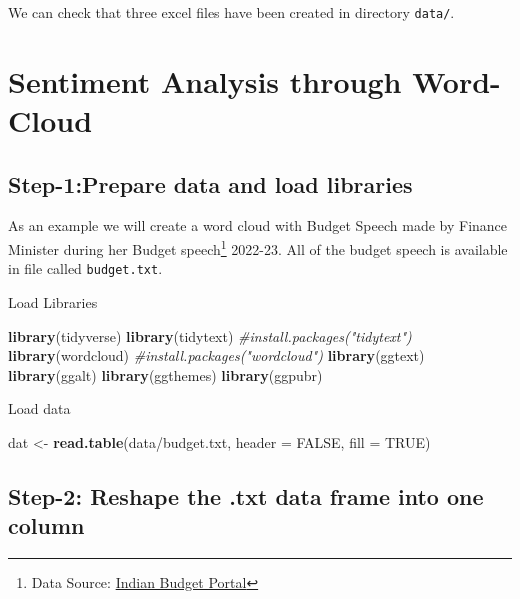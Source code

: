 \documentclass[
]{book}
\newenvironment{Shaded}{\begin{snugshade}}{\end{snugshade}}
\newcommand{\AttributeTok}[1]{\textcolor[rgb]{0.13,0.29,0.53}{#1}}
\newcommand{\CommentTok}[1]{\textcolor[rgb]{0.56,0.35,0.01}{\textit{#1}}}
\newcommand{\ConstantTok}[1]{\textcolor[rgb]{0.56,0.35,0.01}{#1}}
\newcommand{\FunctionTok}[1]{\textcolor[rgb]{0.13,0.29,0.53}{\textbf{#1}}}
\newcommand{\NormalTok}[1]{#1}
\newcommand{\OtherTok}[1]{\textcolor[rgb]{0.56,0.35,0.01}{#1}}
\newcommand{\StringTok}[1]{\textcolor[rgb]{0.31,0.60,0.02}{#1}}
\begin{document}
We can check that three excel files have been created in directory \texttt{data/}.

\hypertarget{sentiment-analysis-through-word-cloud}{%
\chapter{Sentiment Analysis through Word-Cloud}\label{sentiment-analysis-through-word-cloud}}

\hypertarget{step-1prepare-data-and-load-libraries}{%
\section{Step-1:Prepare data and load libraries}\label{step-1prepare-data-and-load-libraries}}

As an example we will create a word cloud with Budget Speech made by Finance Minister during her Budget speech\footnote{Data Source: \href{https://www.indiabudget.gov.in/}{Indian Budget Portal}} 2022-23. All of the budget speech is available in file called \texttt{budget.txt}.

Load Libraries

\begin{Shaded}
\begin{Highlighting}[]
\FunctionTok{library}\NormalTok{(tidyverse)}
\FunctionTok{library}\NormalTok{(tidytext) }\CommentTok{\#install.packages("tidytext")}
\FunctionTok{library}\NormalTok{(wordcloud) }\CommentTok{\#install.packages("wordcloud")}
\FunctionTok{library}\NormalTok{(ggtext)}
\FunctionTok{library}\NormalTok{(ggalt)}
\FunctionTok{library}\NormalTok{(ggthemes)}
\FunctionTok{library}\NormalTok{(ggpubr)}
\end{Highlighting}
\end{Shaded}

Load data

\begin{Shaded}
\begin{Highlighting}[]
\NormalTok{dat }\OtherTok{\textless{}{-}} \FunctionTok{read.table}\NormalTok{(}\StringTok{\textquotesingle{}data/budget.txt\textquotesingle{}}\NormalTok{, }\AttributeTok{header =} \ConstantTok{FALSE}\NormalTok{, }\AttributeTok{fill =} \ConstantTok{TRUE}\NormalTok{)}
\end{Highlighting}
\end{Shaded}

\hypertarget{step-2-reshape-the-.txt-data-frame-into-one-column}{%
\section{Step-2: Reshape the .txt data frame into one column}\label{step-2-reshape-the-.txt-data-frame-into-one-column}}
\end{document}
